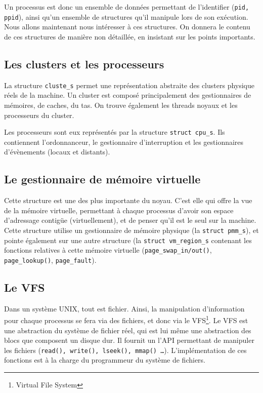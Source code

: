   Un processus est donc un ensemble de données permettant de l'identifier
  (\texttt{pid, ppid}), ainsi qu'un ensemble de structures qu'il manipule lors
  de son exécution. Nous allons maintenant nous intéresser à ces structures. On
  donnera le contenu de ces structures de manière non détaillée, en insistant
  sur les points importants.


  \subsection{Les clusters et les processeurs}

    La structure \texttt{cluste\_s} permet une représentation abstraite des
    clusters physique réels de la machine. Un cluster est composé principalement
    des gestionnaires de mémoires, de caches, du tas. On trouve également les
    threads noyaux et les processeurs du cluster.

    Les processeurs sont eux représentés par la structure \texttt{struct
    cpu\_s}.  Ils contiennent l'ordonnanceur, le gestionnaire d'interruption et
    les gestionnaires d'évènements (locaux et distants).

  \subsection{Le gestionnaire de mémoire virtuelle}

    Cette structure est une des plus importante du noyau. C'est elle qui offre
    la vue de la mémoire virtuelle, permettant à chaque processus d'avoir son
    espace d'adressage contigüe (virtuellement), et de penser qu'il est le seul
    sur la machine. Cette structure utilise un gestionnaire de mémoire physique
    (la \texttt{struct pmm\_s}), et pointe également sur une autre structure (la
    \texttt{struct vm\_region\_s} contenant les fonctions relatives à cette
    mémoire virtuelle (\texttt{page\_swap\_in/out()}, \texttt{page\_lookup()},
    \texttt{page\_fault}).

  \subsection{Le VFS}

    Dans un système UNIX, tout est fichier. Ainsi, la manipulation d'information
    pour chaque processus se fera via des fichiers, et donc via le
    VFS\footnote{Virtual File System}. Le VFS est une abstraction du système de
    fichier réel, qui est lui même une abstraction des blocs que composent un
    disque dur. Il fournit un l'API permettant de manipuler les fichiers
    (\texttt{read(), write(), lseek(), mmap() \ldots}). L'implémentation de ces
    fonctions est à la charge du programmeur du système de fichiers.

